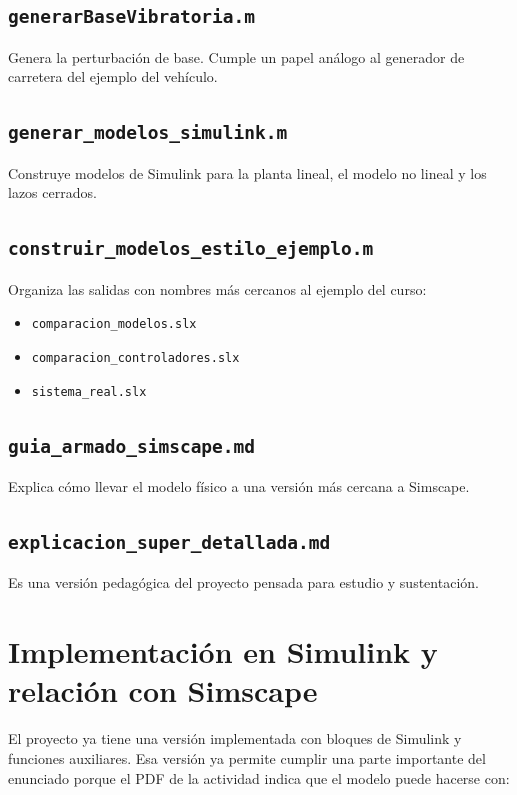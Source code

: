 \documentclass[11pt]{article}
\begin{document}
\subsection*{\texttt{generarBaseVibratoria.m}}

Genera la perturbaci\'on de base. Cumple un papel an\'alogo al generador de carretera del ejemplo del veh\'iculo.

\subsection*{\texttt{generar\_modelos\_simulink.m}}

Construye modelos de Simulink para la planta lineal, el modelo no lineal y los lazos cerrados.

\subsection*{\texttt{construir\_modelos\_estilo\_ejemplo.m}}

Organiza las salidas con nombres m\'as cercanos al ejemplo del curso:

\begin{itemize}[leftmargin=1.2cm]
\item \texttt{comparacion\_modelos.slx}
\item \texttt{comparacion\_controladores.slx}
\item \texttt{sistema\_real.slx}
\end{itemize}

\subsection*{\texttt{guia\_armado\_simscape.md}}

Explica c\'omo llevar el modelo f\'isico a una versi\'on m\'as cercana a Simscape.

\subsection*{\texttt{explicacion\_super\_detallada.md}}

Es una versi\'on pedag\'ogica del proyecto pensada para estudio y sustentaci\'on.

\section{Implementaci\'on en Simulink y relaci\'on con Simscape}

El proyecto ya tiene una versi\'on implementada con bloques de Simulink y funciones auxiliares. Esa versi\'on ya permite cumplir una parte importante del enunciado porque el PDF de la actividad indica que el modelo puede hacerse con:
\end{document}
